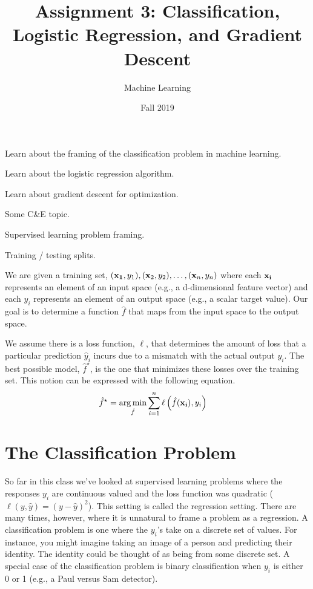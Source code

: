\documentclass[assignment03_Solutions]{subfiles}
\title{Assignment 3: Classification, Logistic Regression, and Gradient Descent}
\author{Machine Learning}
\date{Fall 2019}
\begin{document}
\maketitle
\thispagestyle{firstpage}


\begin{learningobjectives}
\bi
\item Learn about the framing of the classification problem in machine learning.
\item Learn about the logistic regression algorithm.
\item Learn about gradient descent for optimization.
\item Some C\&E topic.
\ei
\end{learningobjectives}

\begin{priorknowledge}
\bi
\item Supervised learning problem framing.
\item Training / testing splits.
\ei
\end{priorknowledge}
\vspace{1em}


\begin{recall}
We are given a training set, $(\mathbf{x_1}, y_1), (\mathbf{x}_2, y_2), \ldots, (\mathbf{x}_n, y_n)$ where each $\mathbf{x_i}$ represents an element of an input space (e.g., a d-dimensional feature vector) and each $y_i$ represents an element of an output space (e.g., a scalar target value).  Our goal is to determine a function $\hat{f}$ that maps from the input space to the output space.

We assume there is a loss function, $\ell$, that determines the amount of loss that a particular prediction $\hat{y}_i$ incurs due to a mismatch with the actual output $y_i$.  The best possible model, $\hat{f}^\star$, is the one that minimizes these losses over the training set.  This notion can be expressed with the following equation.
\begin{align}
\hat{f}^\star &= \operatorname*{arg\,min}_{\hat{f}} \sum_{i=1}^n \ell \left ( \hat{f}(\mathbf{x_i}), y_i \right )
\end{align} 
\end{recall}


\section{The Classification Problem}

So far in this class we've looked at supervised learning problems where the responses $y_i$ are continuous valued and the loss function was quadratic ($\ell(y, \hat{y}) = (y-\hat{y})^2$).  This setting is called the regression setting.  There are many times, however, where it is unnatural to frame a problem as a regression.  A classification problem is one where the $y_i$'s take on a discrete set of values.  For instance, you might imagine taking an image of a person and predicting their identity.  The identity could be thought of as being from some discrete set.  A special case of the classification problem is binary classification when $y_i$ is either 0 or 1 (e.g., a Paul versus Sam detector).
\end{document}
